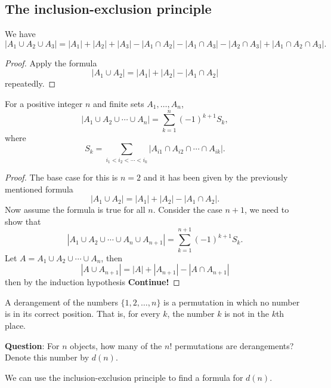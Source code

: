 \documentclass[10pt, a4paper]{article}
\begin{document}
\subsection{The inclusion-exclusion principle}

\begin{proposition}
    We have
    \[
    |A_1 \cup A_2 \cup A_3| = |A_1| + |A_2| + |A_3| - |A_1 \cap A_2| - |A_1 \cap A_3| - |A_2 \cap A_3| + |A_1 \cap A_2 \cap A_3|.
    \]
    \begin{proof}
        Apply the formula
        \[
        |A_1 \cup A_2| = |A_1| + |A_2| - |A_1 \cap A_2|
        \]
        repeatedly.
    \end{proof}
\end{proposition}

\begin{theorem}
    For a positive integer $n$ and finite sets $A_1, \dotsc, A_n$,
    \[
    |A_1 \cup A_2 \cup \dotsi \cup A_n| = \sum_{k = 1}^{n}(-1) ^ {k + 1}S_k,
    \]
    where
    \[
    S_k = \sum_{i_1 < i_2 < \dotsi < i_k}|A_{i1} \cap A_{i2} \cap \dotsi \cap A_{ik}|.
    \]
    \begin{proof}
        The base case for this is $n = 2$ and it has been given by the previously mentioned formula
        \[
        |A_1 \cup A_2| = |A_1| + |A_2| - |A_1 \cap A_2|.
        \]
        Now assume the formula is true for all $n$.
        Consider the case $n + 1$,
        we need to show that
        \[
        |A_1 \cup A_2 \cup \dotsi \cup A_n \cup A_{n + 1}| = \sum_{k = 1}^{n + 1}(-1) ^ {k + 1}S_k.
        \]
        Let $A = A_1 \cup A_2 \cup \dotsi \cup A_n$, then
        \[
        |A \cup A_{n + 1}| = |A| + |A_{n + 1}| - |A \cap A_{n + 1}|
        \]
        then by the induction hypothesis
        \large\textbf{Continue!}
    \end{proof}
\end{theorem}

\begin{definition}[Derangement]
    A derangement of the numbers $\{1, 2, \dotsc, n\}$ is a permutation in which no number is in its correct position.
    That is, for every $k$, the number $k$ is not in the $k$th place.
\end{definition}

\textbf{Question}: For $n$ objects,
how many of the $n!$ permutations are derangements?
Denote this number by $d(n)$.

We can use the inclusion-exclusion principle to find a formula for $d(n)$.
\end{document}
